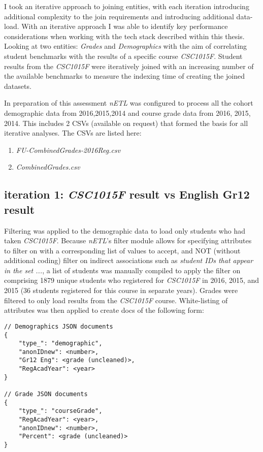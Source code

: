 I took an iterative approach to joining entities, with each iteration introducing additional complexity to the join requirements and introducing additional data-load. With an iterative approach I was able to identify key performance considerations when working with the tech stack described within this thesis. Looking at two entities: \textit{Grades} and \textit{Demographics} with the aim of correlating student benchmarks with the results of a specific course \textit{CSC1015F}. Student results from the \textit{CSC1015F} were iteratively joined with an increasing number of the available benchmarks to measure the indexing time of creating the joined datasets.

In preparation of this assessment \textit{nETL} was configured to process all the cohort demographic data from 2016,2015,2014 and course grade data from 2016, 2015, 2014. This includes 2 CSVs (available on request) that formed the basis for all iterative analyses. The CSVs are listed here:

\begin{enumerate}
    \item \textit{FU-CombinedGrades-2016Reg.csv}
    \item \textit{CombinedGrades.csv}
\end{enumerate}

\subsection{iteration 1: \textit{CSC1015F} result vs English Gr12 result}
Filtering was applied to the demographic data to load only students who had taken \textit{CSC1015F}. Because \textit{nETL}'s filter module allows for specifying attributes to filter on with a corresponding list of values to accept, and NOT (without additional coding) filter on indirect associations such as \textit{student IDs that appear in the set ...}, a list of students was manually compiled to apply the filter on comprising 1879 unique students who registered for \textit{CSC1015F} in 2016, 2015, and 2015 (36 students registered for this course in separate years). Grades were filtered to only load results from the \textit{CSC1015F} course. White-listing of attributes was then applied to create docs of the following form:

\begin{verbatim}
// Demographics JSON documents
{
    "type_": "demographic",
    "anonIDnew": <number>,
    "Gr12 Eng": <grade (uncleaned)>,
    "RegAcadYear": <year>
}

// Grade JSON documents
{
    "type_": "courseGrade",
    "RegAcadYear": <year>,
    "anonIDnew": <number>,
    "Percent": <grade (uncleaned)>
}
\end{verbatim}

